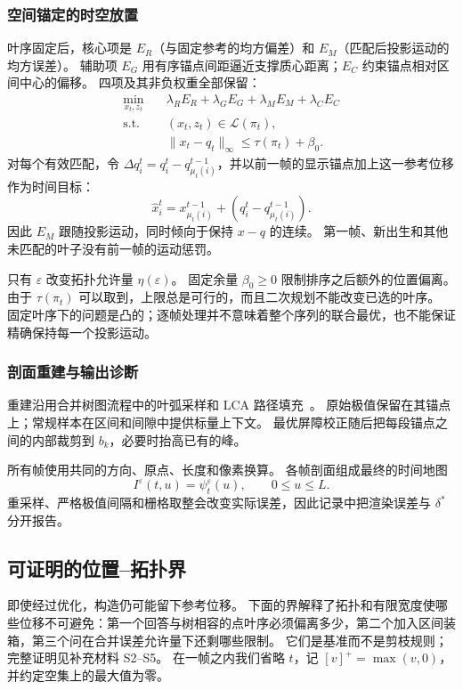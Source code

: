 \documentclass[fontset=none,zihao=5,a4paper]{ctexart}
\begin{document}
\subsubsection{空间锚定的时空放置}
叶序固定后，核心项是 $E_R$（与固定参考的均方偏差）和 $E_M$（匹配后投影运动的均方误差）。
辅助项 $E_G$ 用有序锚点间距逼近支撑质心距离；$E_C$ 约束锚点相对区间中心的偏移。
四项及其非负权重全部保留：
\begin{equation}\label{eq:qp}
\begin{aligned}
 \min_{x_t,z_t}\quad&\lambda_R E_R+\lambda_G E_G+\lambda_M E_M+\lambda_C E_C\\
 \mathrm{s.t.}\quad&(x_t,z_t)\in\mathcal{L}(\pi_t),\\
 &\|x_t-q_t\|_\infty\le\tau(\pi_t)+\beta_0.
\end{aligned}
\end{equation}
对每个有效匹配，令 $\Delta q_i^t=q_i^t-q_{\mu_t(i)}^{t-1}$，并以前一帧的显示锚点加上这一参考位移作为时间目标：
\begin{equation}\label{eq:temporal_target}
 \hat x_i^t=x_{\mu_t(i)}^{t-1}+(q_i^t-q_{\mu_t(i)}^{t-1}).
\end{equation}
因此 $E_M$ 跟随投影运动，同时倾向于保持 $x-q$ 的连续。
第一帧、新出生和其他未匹配的叶子没有前一帧的运动惩罚。

只有 $\varepsilon$ 改变拓扑允许量 $\eta(\varepsilon)$。
固定余量 $\beta_0\ge0$ 限制排序之后额外的位置偏离。
由于 $\tau(\pi_t)$ 可以取到，上限总是可行的，而且二次规划不能改变已选的叶序。
固定叶序下的问题是凸的；逐帧处理并不意味着整个序列的联合最优，也不能保证精确保持每一个投影运动。

\subsubsection{剖面重建与输出诊断}
重建沿用合并树图流程中的叶弧采样和 LCA 路径填充~\cite{Koepp:2023:TMTM,STMTM:2026}。
原始极值保留在其锚点上；常规样本在区间和间隙中提供标量上下文。
最优屏障校正随后把每段锚点之间的内部裁剪到 $b_k$，必要时抬高已有的峰。

所有帧使用共同的方向、原点、长度和像素换算。
各帧剖面组成最终的时间地图
\begin{equation}\label{eq:map}
 I^\varepsilon(t,u)=\psi_t^\varepsilon(u),\qquad 0\le u\le L.
\end{equation}
重采样、严格极值间隔和栅格取整会改变实际误差，因此记录中把渲染误差与 $\delta^*$ 分开报告。

\subsection{可证明的位置–拓扑界}\label{sec:bounds}
即使经过优化，构造仍可能留下参考位移。
下面的界解释了拓扑和有限宽度使哪些位移不可避免：第一个回答与树相容的点叶序必须偏离多少，第二个加入区间装箱，第三个问在合并误差允许量下还剩哪些限制。
它们是基准而不是剪枝规则；完整证明见补充材料 S2--S5。
在一帧之内我们省略 $t$，记 $[v]^+=\max(v,0)$，并约定空集上的最大值为零。
\end{document}
